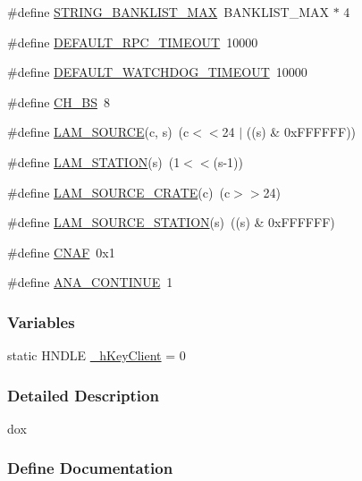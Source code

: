 \begin{DoxyCompactItemize}
\#define \hyperlink{group__midasincludecode_gafec0c8869c3f66ea7d186ec4b7682fc0}{STRING\_\-BANKLIST\_\-MAX}~BANKLIST\_\-MAX $\ast$ 4
\item 
\#define \hyperlink{group__midasincludecode_ga39d21da28bfcbf0caba6bd19ef551f36}{DEFAULT\_\-RPC\_\-TIMEOUT}~10000
\item 
\#define \hyperlink{group__midasincludecode_ga277afc8607c7a55aafffc11d69be143c}{DEFAULT\_\-WATCHDOG\_\-TIMEOUT}~10000
\item 
\#define \hyperlink{group__midasincludecode_gaf5ec05509b0e59d4796795063e6c01d3}{CH\_\-BS}~8
\item 
\#define \hyperlink{group__midasincludecode_ga93fde3913a488880c4f96267e24579ee}{LAM\_\-SOURCE}(c, s)~(c$<$$<$24 $|$ ((s) \& 0xFFFFFF))
\item 
\#define \hyperlink{group__midasincludecode_ga479219e07f43223f74ff8638705a804e}{LAM\_\-STATION}(s)~(1$<$$<$(s-\/1))
\item 
\#define \hyperlink{group__midasincludecode_gafac465450c8035c37ba5482970e026eb}{LAM\_\-SOURCE\_\-CRATE}(c)~(c$>$$>$24)
\item 
\#define \hyperlink{group__midasincludecode_gae70f372186346224788f2980de071736}{LAM\_\-SOURCE\_\-STATION}(s)~((s) \& 0xFFFFFF)
\item 
\#define \hyperlink{group__midasincludecode_gaabc611f59210401f11ea4247291c4468}{CNAF}~0x1
\item 
\#define \hyperlink{group__midasincludecode_ga5047333a47cabd84504052d921f5e82d}{ANA\_\-CONTINUE}~1
\end{DoxyCompactItemize}
\subsubsection*{Variables}
\begin{DoxyCompactItemize}
\item 
static HNDLE \hyperlink{group__midasincludecode_ga45b376d484f59dd1b1eaa1a2d9db5496}{\_\-hKeyClient} = 0
\end{DoxyCompactItemize}


\subsubsection{Detailed Description}
dox 

\subsubsection{Define Documentation}
